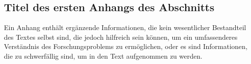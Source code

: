 \documentclass[pdflatex,sn-mathphys-num]{sn-jnl}%
\theoremstyle{thmstyleone}%
\theoremstyle{thmstyletwo}%
\theoremstyle{thmstylethree}%
\begin{document}
\begin{appendices}

\section{Titel des ersten Anhangs des Abschnitts}\label{secA1}

Ein Anhang enthält ergänzende Informationen, die kein wesentlicher Bestandteil des Textes selbst sind, die jedoch hilfreich sein können, um ein umfassenderes Verständnis des Forschungsproblems zu ermöglichen, oder es sind Informationen, die zu schwerfällig sind, um in den Text aufgenommen zu werden.




\end{appendices}


\end{document}
